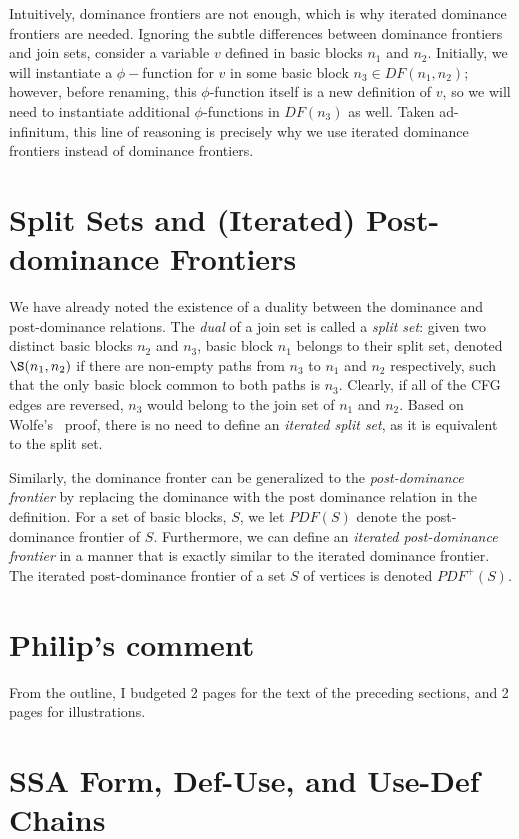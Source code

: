 Intuitively, dominance frontiers are not enough, which is why
iterated dominance frontiers are needed. Ignoring the subtle
differences between dominance frontiers and join sets, consider
a variable $v$ defined in basic blocks $n_{1}$ and $n_{2}$. Initially,
we will instantiate a $\phi-$function for $v$ in some basic block
$n_{3} \in DF(n_{1}, n_{2})$; however, before renaming, this
$\phi$-function itself is a new definition of $v$, so we will need
to instantiate additional $\phi$-functions in $DF(n_{3})$ as well.
Taken ad-infinitum, this line of reasoning is precisely why we
use iterated dominance frontiers instead of dominance frontiers. 

\section{Split Sets and (Iterated) Post-dominance Frontiers}

We have already noted the existence of a duality between the 
dominance and post-dominance relations. The \emph{dual} of
a join set is called a \emph{split set}: given two distinct
basic blocks $n_{2}$ and $n_{3}$, basic block $n_{1}$ belongs
to their split set, denoted $\S(n_{1}, n_{2})$ if there 
are non-empty paths from $n_{3}$ to $n_{1}$ and $n_{2}$
respectively, such that the only basic block common to both
paths is $n_{3}$. Clearly, if all of the CFG edges are
reversed, $n_{3}$ would belong to the join set of $n_{1}$
and $n_{2}$. Based on Wolfe's~\cite{WolfeJul94} proof,
there is no need to define an \emph{iterated split set}, 
as it is equivalent to the split set. 

Similarly, the dominance fronter can be generalized 
to the \emph{post-dominance frontier} by replacing the
dominance with the post dominance relation in the definition.
For a set of basic blocks, $S$, we let $PDF(S)$ denote
the post-dominance frontier of $S$. Furthermore, we can
define an \emph{iterated post-dominance frontier} in a 
manner that is exactly similar to the iterated dominance
frontier. The iterated post-dominance frontier of a set
$S$ of vertices is denoted $PDF^{+}(S)$. 

\section{Philip's comment}

From the outline, I budgeted 2 pages for the text of
the preceding sections, and 2 pages for illustrations.

\section{SSA Form, Def-Use, and Use-Def Chains}

